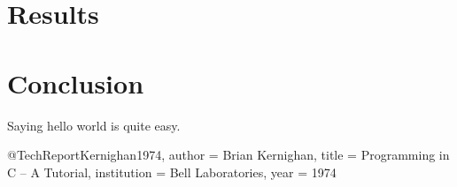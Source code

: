 \documentclass[english, version-2022-01]{uzl-thesis}
\begin{document}
\chapter{Results}











\chapter{Conclusion}
Saying hello world is quite easy.
\begin{bibtex-entries}
@TechReport{Kernighan1974,
	author = {Brian Kernighan},
	title = {Programming in C – A Tutorial},
	institution = {Bell Laboratories},
	year = {1974}
}
\end{bibtex-entries}
\end{document}

